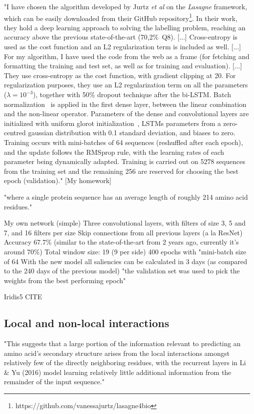 "I have chosen the algorithm developed by Jurtz \textit{et al} \cite{Jurtz2017} on the \textit{Lasagne} framework, which can be easily downloaded from their GitHub repository\footnote{https://github.com/vanessajurtz/lasagne4bio}. In their work, they hold a deep learning approach to solving the labelling problem, reaching an accuracy above the previous state-of-the-art (70,2\%~Q8).
[...]
Cross-entropy is used as the cost function and an L2 regularization term is included as well.
[...]
For my algorithm, I have used the code from the web as a frame (for fetching and formatting the training and test set, as well as for training and evaluation).
[...]
They use cross-entropy as the cost function, with gradient clipping at 20. For regularization purposes, they use an L2 regularization term on all the parameters ($\lambda=10^{-3}$), together with 50\% dropout technique after the bi-LSTM. Batch normalization~\cite{Ioffe2015} is applied in the first dense layer, between the linear combination and the non-linear operator. Parameters of the dense and convolutional layers are initialized with uniform glorot initialization~\cite{Glorot2010}, LSTMs parameters from a zero-centred gaussian distribution with 0.1 standard deviation, and biases to zero. Training occurs with mini-batches of 64 sequences (reshuffled after each epoch), and the update follows the RMSprop rule, with the learning rates of each parameter being dynamically adapted. Training is carried out on 5278 sequences from the training set and the remaining 256 are reserved for choosing the best epoch (validation)." [My homework]

"where a single protein sequence has an average length of roughly 214 amino acid residues." \cite{Busia2017}

My own network (simple)
Three convolutional layers, with filters of size 3, 5 and 7, and 16 filters per size
Skip connections from all previous layers (a la ResNet)
Accuracy 67.7\% (similar to the state-of-the-art from 2 years ago, currently it’s around 70\%)
Total window size: 19 (9 per side)
400 epochs with "mini-batch size of 64
With the new model all saliencies can be calculated in 3 days (as compared to the 240 days of the previous model)
"the validation set was used to pick the weights from the best performing epoch" \cite{Jurtz2017}

Iridis5 CITE

\subsection{Local and non-local interactions}
"This suggests that a large portion of the information relevant to predicting an amino acid’s secondary structure arises from the local interactions amongst relatively few of the directly neighboring residues, with the recurrent layers in Li \& Yu (2016) model learning relatively little additional information from the remainder of the input sequence." \cite{Busia2017}

